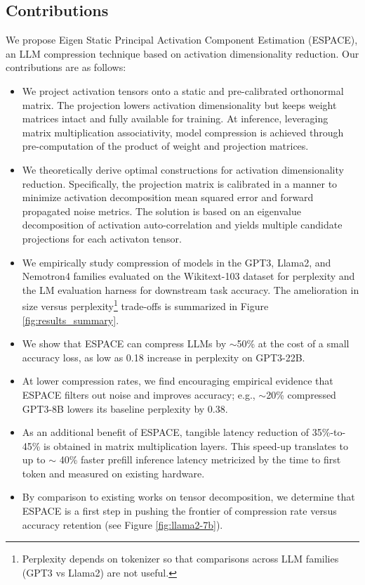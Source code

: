 \documentclass{article}
\theoremstyle{plain}
\begin{document}
\subsection{Contributions}
\label{sec:contributions}
We propose Eigen Static Principal Activation Component Estimation (ESPACE), an LLM compression technique based on activation dimensionality reduction. Our contributions are as follows:
\begin{itemize}[leftmargin=1\baselineskip,itemsep=0\baselineskip,topsep=0pt]
\item We project activation tensors onto a static and pre-calibrated orthonormal matrix. The projection lowers activation dimensionality but keeps weight matrices intact and fully available for training. At inference, leveraging matrix multiplication associativity, model compression is achieved through pre-computation of the product of weight and projection matrices.
\item We theoretically derive optimal constructions for activation dimensionality reduction. Specifically, the projection matrix is calibrated in a manner to minimize activation decomposition mean squared error and forward propagated noise metrics. The solution is based on an eigenvalue decomposition of activation auto-correlation and yields multiple candidate projections for each activaton tensor. 
\item We empirically study compression of models in the GPT3, Llama2, {and Nemotron4} families evaluated on the Wikitext-103 dataset for perplexity and the LM evaluation harness for downstream task accuracy. The amelioration in size versus perplexity\footnote{\label{fn:ppl}Perplexity depends on tokenizer so that comparisons across LLM families (GPT3 vs Llama2) are not useful.} trade-offs is summarized in Figure \ref{fig:results_summary}. 
\item We show that ESPACE can compress LLMs by $\sim$50\% at the cost of a small accuracy loss, as low as 0.18 increase in perplexity on GPT3-22B. 
\item At lower compression rates, we find encouraging empirical evidence that ESPACE filters out noise and improves accuracy; e.g., $\sim$20\% compressed GPT3-8B lowers its baseline perplexity by 0.38. 
\item As an additional benefit of ESPACE, tangible latency reduction of 35\%-to-45\% is obtained in matrix multiplication layers. This speed-up translates to up to $\sim$ 40\% faster prefill inference latency metricized by the time to first token and measured on existing hardware.
\item By comparison to existing works on tensor decomposition, we determine that ESPACE is a first step in pushing the frontier of compression rate versus accuracy retention (see Figure \ref{fig:llama2-7b}).
\end{itemize}
\end{document}
